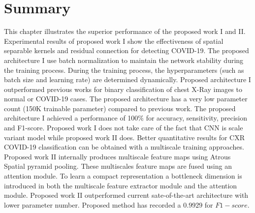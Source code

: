 \section{Summary}
This chapter illustrates the superior performance of the proposed work I and II. Experimental results of proposed work I show the effectiveness of spatial separable kernels and residual connection for detecting COVID-19. The proposed architecture I use batch normalization to maintain the network stability during the training process. During the training process, the hyperparameters (such as batch size and learning rate) are determined dynamically. Proposed architecture I outperformed previous works for binary classification of chest X-Ray images to normal or COVID-19 cases. The proposed architecture has a very low parameter count (150K trainable parameter) compared to previous work. The proposed  architecture I achieved a performance of 100\% for accuracy, sensitivity, precision and F1-score. Proposed work I does not take care of the fact that CNN is scale variant model while proposed work II does. Better quantitative results for CXR COVID-19 classification can be obtained with a multiscale training approaches. Proposed work II internally produces multiscale feature maps using Atrous Spatial pyramid pooling. These multiscales feature maps are fused using an attention module. To learn a compact representation a bottleneck dimension is introduced in both the multiscale feature extractor module and the attention module. Proposed work II outperformed current sate-of-the-art architecture with lower parameter number. Proposed method has recorded a $0.9929$ for $F1-score$.
